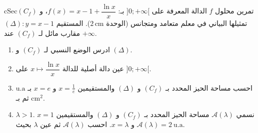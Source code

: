 \documentclass[12pt,a4paper]{article}
\newenvironment{BOX}[2]{\begin{otherlanguage}{english}\begin{arbox}{#1}{#2}}{\end{arbox}\end{otherlanguage}}
\newcounter{exo}
\newenvironment{tmr}{\stepcounter{exo}\begin{BOX}{cSec}{تمرين محلول \theexo}}{\end{BOX}}
\newcommand{\ua}{\ \mathrm{u.a}}
\begin{document}
\begin{tmr}
$f$ الدالة المعرفة على $]0;+\infty[$ بـ: $f(x)=x-1+\dfrac{\ln x}{x}$، و $(C_f)$ تمثيلها البياني في معلم متعامد ومتجانس (الوحدة $2\,\mathrm{cm}$). المستقيم $(\Delta):y=x-1$ مقارب مائل لـ $(C_f)$ عند $+\infty$.
\begin{enumerate}
\item ادرس الوضع النسبي لـ $(C_f)$ و $(\Delta)$.
\item عين دالة أصلية للدالة $x\mapsto\dfrac{\ln x}{x}$ على $]0;+\infty[$.
\item احسب مساحة الحيز المحدد بـ $(C_f)$ و $(\Delta)$ والمستقيمين $x=\frac{1}{e}$ و $x=e$ بـ $\mathrm{u.a}$ ثم بـ $\mathrm{cm}^{2}$.
\item $\lambda>1$. نسمي $\mathcal{A}(\lambda)$ مساحة الحيز المحدد بـ $(C_f)$ و $(\Delta)$ والمستقيمين $x=1$ و $x=\lambda$. احسب $\mathcal{A}(\lambda)$ ثم عين $\lambda$ بحيث $\mathcal{A}(\lambda)=2\ua$.
\end{enumerate}
\end{tmr}
\end{document}
